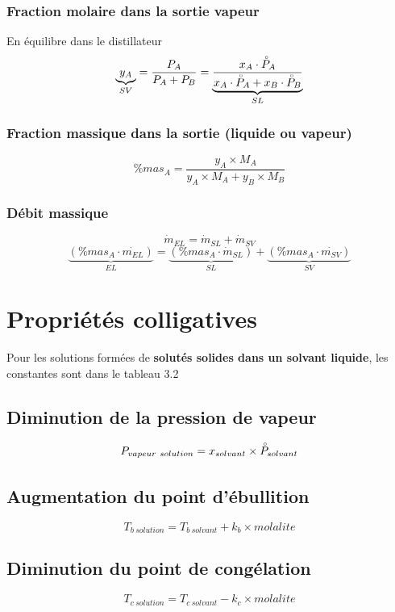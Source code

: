 \documentclass[twocolumn,letterpaper,8pt]{extarticle}
\begin{document}
\subsubsection{Fraction molaire dans la sortie vapeur}
En équilibre dans le distillateur
$$\underbrace{y_{A}}_{SV}=\frac{P_A}{P_A + P_B}=\underbrace{\frac{x_A \cdot \accentset{\circ}{P}_A}{x_A \cdot \accentset{\circ}{P}_A + x_B \cdot \accentset{\circ}{P}_B}}_{SL}$$

\subsubsection{Fraction massique dans la sortie (liquide ou vapeur)}
$$\% mas_{A} = \frac{y_{A} \times M_A}{y_{A} \times M_A + y_{B} \times M_B}$$

\subsubsection{Débit massique}
$$\dot{m}_{EL}= \dot{m}_{SL} + \dot{m}_{SV}$$
$$\underbrace{(\% mas_{A}\cdot \dot{m_{EL}})}_{EL} = \underbrace{(\% mas_{A} \cdot \dot{m}_{SL})}_{SL} + \underbrace{(\% mas_{A} \cdot \dot{m_{SV}})}_{SV}$$

\section{Propriétés colligatives}
{\small *Pour les solutions formées de \textbf{solutés solides dans un solvant liquide}, les constantes sont dans le tableau 3.2}

\subsection{Diminution de la pression de vapeur}
$$P_{vapeur\ solution}=x_{solvant} \times \accentset{\circ}{P}_{solvant}$$

\subsection{Augmentation du point d'ébullition}
$$T_{b\ solution} = T_{b\ solvant} + k_b \times molalite$$

\subsection{Diminution du point de congélation}
$$T_{c\ solution} = T_{c\ solvant} - k_c \times molalite$$
\end{document}
